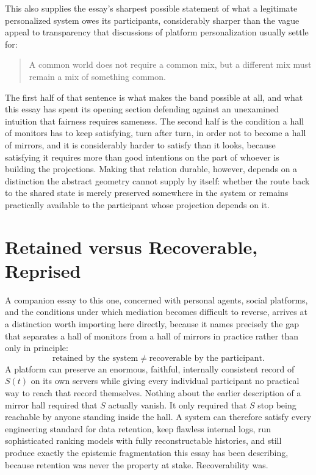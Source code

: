 \documentclass[12pt]{article}
\begin{document}
This also supplies the essay's sharpest possible statement of what a legitimate personalized system owes its participants, considerably sharper than the vague appeal to transparency that discussions of platform personalization usually settle for:
\begin{quote}
A common world does not require a common mix, but a different mix must remain a mix of something common.
\end{quote}
The first half of that sentence is what makes the band possible at all, and what this essay has spent its opening section defending against an unexamined intuition that fairness requires sameness. The second half is the condition a hall of monitors has to keep satisfying, turn after turn, in order not to become a hall of mirrors, and it is considerably harder to satisfy than it looks, because satisfying it requires more than good intentions on the part of whoever is building the projections. Making that relation durable, however, depends on a distinction the abstract geometry cannot supply by itself: whether the route back to the shared state is merely preserved somewhere in the system or remains practically available to the participant whose projection depends on it.

\section{Retained versus Recoverable, Reprised}

A companion essay to this one, concerned with personal agents, social platforms, and the conditions under which mediation becomes difficult to reverse, arrives at a distinction worth importing here directly, because it names precisely the gap that separates a hall of monitors from a hall of mirrors in practice rather than only in principle:
\[
\text{retained by the system} \neq \text{recoverable by the participant}.
\]
A platform can preserve an enormous, faithful, internally consistent record of $S(t)$ on its own servers while giving every individual participant no practical way to reach that record themselves. Nothing about the earlier description of a mirror hall required that $S$ actually vanish. It only required that $S$ stop being reachable by anyone standing inside the hall. A system can therefore satisfy every engineering standard for data retention, keep flawless internal logs, run sophisticated ranking models with fully reconstructable histories, and still produce exactly the epistemic fragmentation this essay has been describing, because retention was never the property at stake. Recoverability was.
\end{document}
